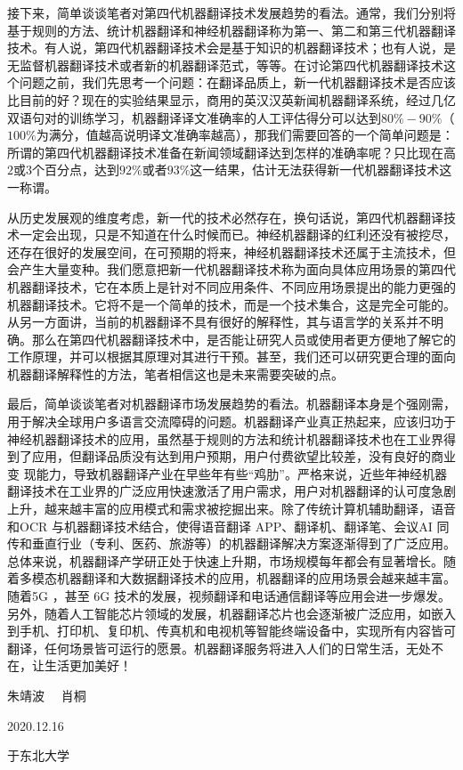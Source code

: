 \begin{spacing}{1.18}
\parinterval 接下来，简单谈谈笔者对第四代机器翻译技术发展趋势的看法。通常，我们分别将基于规则的方法、统计机器翻译和神经机器翻译称为第一、第二和第三代机器翻译技术。有人说，第四代机器翻译技术会是基于知识的机器翻译技术；也有人说，是无监督机器翻译技术或者新的机器翻译范式，等等。在讨论第四代机器翻译技术这个问题之前，我们先思考一个问题：在翻译品质上，新一代机器翻译技术是否应该比目前的好？现在的实验结果显示，商用的英汉汉英新闻机器翻译系统，经过几亿双语句对的训练学习，机器翻译译文准确率的人工评估得分可以达到$80\%-90\%$（$100\%$为满分，值越高说明译文准确率越高），那我们需要回答的一个简单问题是：所谓的第四代机器翻译技术准备在新闻领域翻译达到怎样的准确率呢？只比现在高$2$或$3$个百分点，达到$92\%$或者$93\%$这一结果，估计无法获得新一代机器翻译技术这一称谓。

\parinterval 从历史发展观的维度考虑，新一代的技术必然存在，换句话说，第四代机器翻译技术一定会出现，只是不知道在什么时候而已。神经机器翻译的红利还没有被挖尽，还存在很好的发展空间，在可预期的将来，神经机器翻译技术还属于主流技术，但会产生大量变种。我们愿意把新一代机器翻译技术称为面向具体应用场景的第四代机器翻译技术，它在本质上是针对不同应用条件、不同应用场景提出的能力更强的机器翻译技术。它将不是一个简单的技术，而是一个技术集合，这是完全可能的。从另一方面讲，当前的机器翻译不具有很好的解释性，其与语言学的关系并不明确。那么在第四代机器翻译技术中，是否能让研究人员或使用者更方便地了解它的工作原理，并可以根据其原理对其进行干预。甚至，我们还可以研究更合理的面向机器翻译解释性的方法，笔者相信这也是未来需要突破的点。

\parinterval 最后，简单谈谈笔者对机器翻译市场发展趋势的看法。机器翻译本身是个强刚需，用于解决全球用户多语言交流障碍的问题。机器翻译产业真正热起来，应该归功于神经机器翻译技术的应用，虽然基于规则的方法和统计机器翻译技术也在工业界得到了应用，但翻译品质没有达到用户预期，用户付费欲望比较差，没有良好的商业变  现能力，导致机器翻译产业在早些年有些“鸡肋”。严格来说，近些年神经机器翻译技术在工业界的广泛应用快速激活了用户需求，用户对机器翻译的认可度急剧上升，越来越丰富的应用模式和需求被挖掘出来。除了传统计算机辅助翻译，语音和OCR 与机器翻译技术结合，使得语音翻译 APP、翻译机、翻译笔、会议AI 同传和垂直行业（专利、医药、旅游等）的机器翻译解决方案逐渐得到了广泛应用。总体来说，机器翻译产学研正处于快速上升期，市场规模每年都会有显著增长。随着多模态机器翻译和大数据翻译技术的应用，机器翻译的应用场景会越来越丰富。随着5G ，甚至 6G 技术的发展，视频翻译和电话通信翻译等应用会进一步爆发。另外，随着人工智能芯片领域的发展，机器翻译芯片也会逐渐被广泛应用，如嵌入到手机、打印机、复印机、传真机和电视机等智能终端设备中，实现所有内容皆可翻译，任何场景皆可运行的愿景。机器翻译服务将进入人们的日常生活，无处不在，让生活更加美好！\\

\vspace{8em}

\hfill 朱靖波 \ \ 肖桐

\hfill 2020.12.16

\hfill 于东北大学


\end{spacing}
